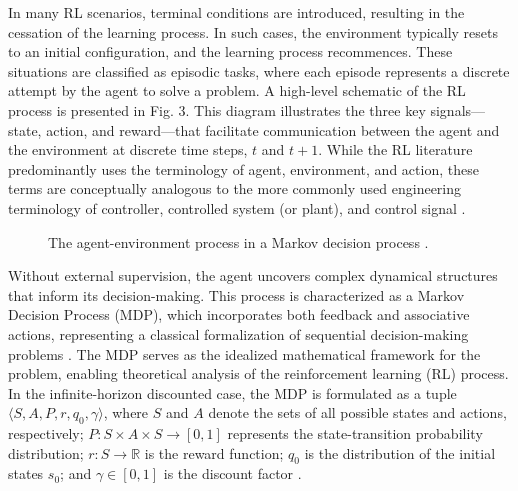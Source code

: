 \documentclass[conference]{IEEEtran}
\begin{document}
In many RL scenarios, terminal conditions are introduced, resulting in the cessation of the learning process. In such cases, the environment typically resets to an initial configuration, and the learning process recommences. These situations are classified as episodic tasks, where each episode represents a discrete attempt by the agent to solve a problem. A high-level schematic of the RL process is presented in Fig. 3. This diagram illustrates the three key signals—state, action, and reward—that facilitate communication between the agent and the environment at discrete time steps, \( t \) and \( t+1 \). While the RL literature predominantly uses the terminology of agent, environment, and action, these terms are conceptually analogous to the more commonly used engineering terminology of controller, controlled system (or plant), and control signal \cite{48}.
\begin{figure}[H]
	\begin{center}
	\end{center}
	\caption{The agent-environment process in a Markov decision process \cite{Sutton}.}
	\label{fig:agent_env}
\end{figure}

Without external supervision, the agent uncovers complex dynamical structures that inform its decision-making. This process is characterized as a Markov Decision Process (MDP), which incorporates both feedback and associative actions, representing a classical formalization of sequential decision-making problems \cite{48}. The MDP serves as the idealized mathematical framework for the problem, enabling theoretical analysis of the reinforcement learning (RL) process. In the infinite-horizon discounted case, the MDP is formulated as a tuple \( \langle S, A, P, r, q_0, \gamma \rangle \), where \( S \) and \( A \) denote the sets of all possible states and actions, respectively; \( P : S \times A \times S \to [0, 1] \) represents the state-transition probability distribution; \( r : S \to \mathbb{R} \) is the reward function; \( q_0 \) is the distribution of the initial states \( s_0 \); and \( \gamma \in [0, 1] \) is the discount factor \cite{49}.
\end{document}
